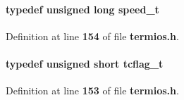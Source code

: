 \paragraph[{speed\+\_\+t}]{\setlength{\rightskip}{0pt plus 5cm}typedef unsigned long {\bf speed\+\_\+t}}\label{termios_8h_a897bee08bb5174220844fc9313da03e7}


Definition at line {\bf 154} of file {\bf termios.\+h}.

\paragraph[{tcflag\+\_\+t}]{\setlength{\rightskip}{0pt plus 5cm}typedef unsigned short {\bf tcflag\+\_\+t}}\label{termios_8h_a12046b4322de1f4b85ed29267aa8173a}


Definition at line {\bf 153} of file {\bf termios.\+h}.

